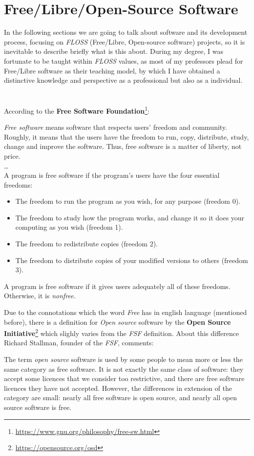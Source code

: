 \documentclass[a4paper, 12pt]{book}
\begin{document}
\section{Free/Libre/Open-Source Software}
\label{sec:floss-definition}
In the following sections we are going to talk about software and its development process, focusing on \emph{FLOSS} (Free/Libre, Open-source
software) projects, so it is inevitable to describe briefly what is this about.
During my degree, I was fortunate to be taught within \emph{FLOSS} values, as most of my professors plead
for Free/Libre software as their teaching model, by which I have obtained a distinctive knowledge and perspective as a professional but also as a individual.\\\\\\
According to the \textbf{Free Software Foundation}\footnote{\url{https://www.gnu.org/philosophy/free-sw.html}}:
\begin{displayquote}
    \emph{Free software} means software that respects users' freedom and community. Roughly, it means that the users have the freedom
    to run, copy, distribute, study, change and improve the software. Thus, free software is a matter of liberty, not price.\\
    \ldots\\
    A program is free software if the program's users have the four essential freedoms:
       \begin{itemize}
           \item The freedom to run the program as you wish, for any purpose (freedom 0).
           \item The freedom to study how the program works, and change it so it does your computing as you wish (freedom 1).
           \item The freedom to redistribute copies (freedom 2).
           \item The freedom to distribute copies of your modified versions to others (freedom 3).
       \end{itemize}
    A program is free software if it gives users adequately all of these freedoms. Otherwise, it is \textit{nonfree}.
\end{displayquote}
Due to the connotations which the word \emph{Free} has in english language (mentioned before), there is a definition
for \emph{Open source} software by the \textbf{Open Source Initiative}\footnote{\url{https://opensource.org/osd}} which
slighly varies from the \emph{FSF} definition. About this difference Richard Stallman, founder of the \emph{FSF}, comments:
\begin{displayquote}
The term \emph{open source} software is used by some people to mean more or less the same category as free software.
It is not exactly the same class of software: they accept some licences that we consider too restrictive,
and there are free software licences they have not accepted. However, the differences in extension of the
category are small: nearly all free software is open source, and nearly all open source software is free.
\end{displayquote}
\end{document}
